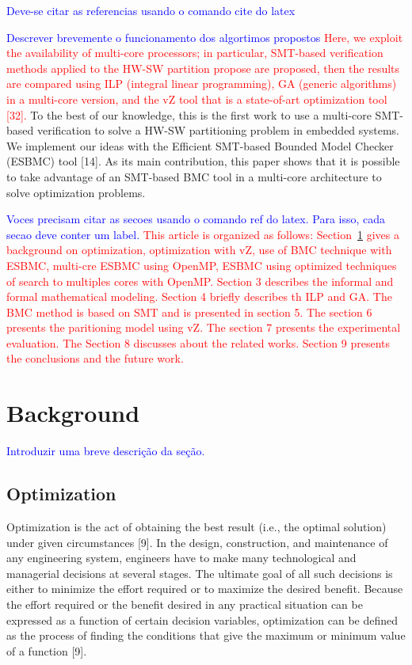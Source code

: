 \textcolor{blue}{Deve-se citar as referencias usando o comando cite do latex}

\textcolor{Red}{\textcolor{blue}{Descrever brevemente o funcionamento dos algortimos propostos} Here, we exploit the availability of multi-core processors; in particular, SMT-based verification methods applied to the HW-SW partition propose are proposed, then the results are compared using ILP (integral linear programming), GA (generic algorithms) in a multi-core version, and the vZ tool that is a state-of-art optimization tool [32].} To the best of our knowledge, this is the first work to use a multi-core SMT-based verification to solve a HW-SW partitioning problem in embedded systems. We implement our ideas with the Efficient SMT-based Bounded Model Checker (ESBMC) tool [14]. As its main contribution, this paper shows that it is possible to take advantage of an SMT-based BMC tool in a multi-core architecture to solve optimization problems.

\textcolor{blue}{Voces precisam citar as secoes usando o comando ref do latex. Para isso, cada secao deve conter um label.}
\textcolor{Red}{This article is organized as follows: Section~\ref{background} gives a background on optimization, optimization with vZ, use of BMC technique with ESBMC, multi-cre ESBMC using OpenMP, ESBMC using optimized techniques of search to multiples cores with OpenMP. Section 3 describes the informal and formal mathematical modeling. Section 4 briefly describes th ILP and GA. The BMC method is based on SMT and is presented in section 5. The section 6 presents the paritioning model using vZ. The section 7 presents the experimental evaluation. The Section 8 discusses about the related works. Section 9 presents the conclusions and the future work.}

\section{Background}
\label{background}

\textcolor{blue}{Introduzir uma breve descrição da seção.}

\subsection{Optimization}

Optimization is the act of obtaining the best result (i.e., the optimal solution) under given circumstances [9]. In the design, construction, and maintenance of any engineering system, engineers have to make many technological and managerial decisions at several stages. The ultimate goal of all such decisions is either to minimize the effort required or to maximize the desired benefit. Because the effort required or the benefit desired in any practical situation can be expressed as a function of certain decision variables, optimization can be defined as the process of finding the conditions that give the maximum or minimum value of a function [9].

